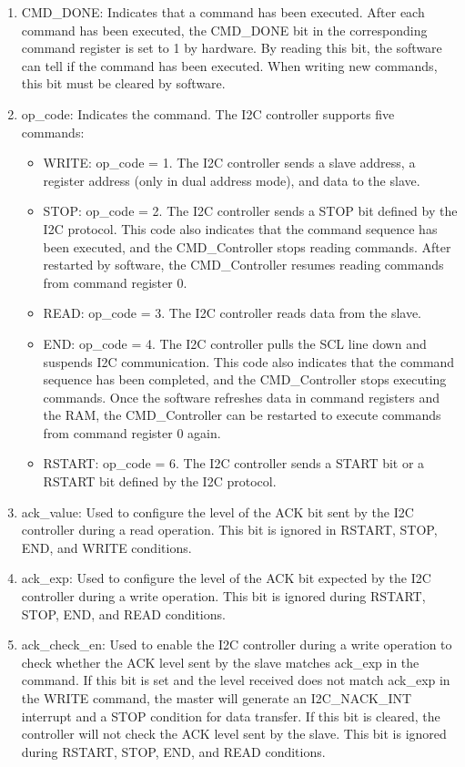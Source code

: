 \documentclass[main\_\_EN.tex]{subfiles}
\begin{document}
\begin{enumerate}
\item CMD\_DONE: Indicates that a command has been executed. After each command has been executed, the CMD\_DONE bit in the corresponding command register is set to 1 by hardware. By reading this bit, the software can tell if the command has been executed. When writing new commands, this bit must be cleared by software.

\item op\_code: Indicates the command. The I2C controller supports five commands:

\begin{itemize}
    \item WRITE: op\_code = 1. The I2C controller sends a slave address, a register address  (only in dual address mode), and data to the slave.
    \item STOP: op\_code = 2. The I2C controller sends a STOP bit defined by the I2C protocol. This code also indicates that the command sequence has been executed, and the CMD\_Controller stops reading commands. After restarted by software, the CMD\_Controller resumes reading commands from command register 0.
    \item READ: op\_code = 3. The I2C controller reads data from the slave.
    \item END: op\_code = 4. The I2C controller pulls the SCL line down and suspends I2C communication. This code also indicates that the command sequence has been completed, and the CMD\_Controller stops executing commands. Once the software refreshes data in command registers and the RAM, the CMD\_Controller can be restarted to execute commands from command register 0 again.
    \item RSTART: op\_code = 6. The I2C controller sends a START bit or a RSTART bit defined by the I2C protocol.
\end{itemize}

\item ack\_value: Used to configure the level of the ACK bit sent by the I2C controller during a read operation. This bit is ignored in RSTART, STOP, END, and WRITE conditions.

\item ack\_exp: Used to configure the level of the ACK bit expected by the I2C controller during a write operation. This bit is ignored during RSTART, STOP, END, and READ conditions.

\item ack\_check\_en: Used to enable the I2C controller during a write operation to check whether the ACK level sent by the slave matches ack\_exp in the command. If this bit is set and the level received does not match ack\_exp in the WRITE command, the master will generate an I2C\_NACK\_INT interrupt and a STOP condition for data transfer. If this bit is cleared, the controller will not check the ACK level sent by the slave. This bit is ignored during RSTART, STOP, END, and READ conditions.


\end{enumerate}
\end{document}
